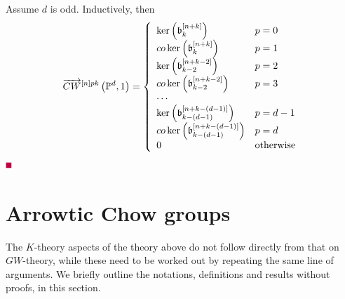 \documentclass[12pt]{article}
\begin{document}
Assume $d$ is odd. Inductively, then
$$
\ora{CW}^{\LRt{n}pk}\LRf{{\BP}^d, 1} =
%
\LBrace{{ll}
\ker\LRf{\b_k^{\LRt{n+k}}} & p=0\\
co\ker\LRf{\b_k^{\LRt{n+k}}} & p=1\\
\ker\LRf{\b_{k-2}^{\LRt{n+k-2}}} & p=2\\
co\ker\LRf{\b_{k-2}^{\LRt{n+k-2}}} & p=3\\
\cdots\\
\ker\LRf{\b_{k-(d-1)}^{\LRt{n+k-(d-1)}}}&p=d-1\\
co\ker\LRf{\b_{k-(d-1)}^{\LRt{n+k-(d-1)}}}&p= d\\
0 & {\rm otherwise}\\
} 
$$
\pic $\eop$ 
 
 
\section{Arrowtic Chow groups} \label{secChow}
The $K$-theory aspects of the theory above do not follow directly from that on $GW$-theory, while these need to be worked out by repeating the same line of arguments. We briefly outline the notations, definitions and results without proofs, in this section. 
\end{document}
